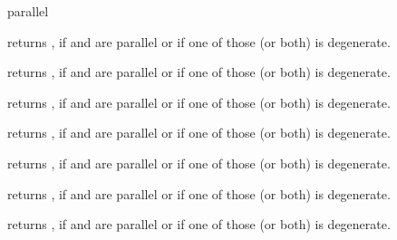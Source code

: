 \begin{ccRefFunction}{parallel}

\ccHtmlNoLinks
{}
{returns , if  and  are parallel or if one
of those (or both) is degenerate.}

\ccHtmlNoLinks
{}
{returns , if  and  are parallel or if one
of those (or both) is degenerate.}

\ccHtmlNoLinks
{}
{returns , if  and  are parallel or if one
of those (or both) is degenerate.}

\ccHtmlNoLinks
{}
{returns , if  and  are parallel or if one
of those (or both) is degenerate.}

\ccHtmlNoLinks
{}
{returns , if  and  are parallel or if one
of those (or both) is degenerate.}

\ccHtmlNoLinks
{}
{returns , if  and  are parallel or if one
of those (or both) is degenerate.}

\ccHtmlNoLinks
{}
{returns , if  and  are parallel or if one
of those (or both) is degenerate.}

\end{ccRefFunction}
